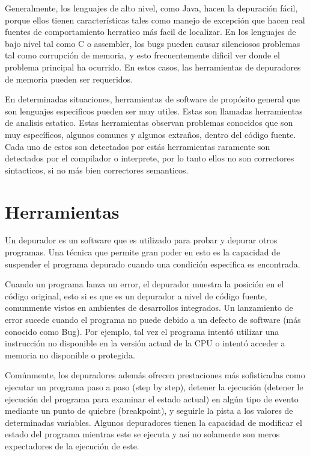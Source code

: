 \documentclass[12pt,a4paper]{report}
\begin{document}
Generalmente, los lenguajes de alto nivel, como Java, hacen la depuración fácil, porque ellos tienen características tales como manejo de excepción que hacen real fuentes de comportamiento herratico más facil de localizar.  En los lenguajes de bajo nivel tal como C o assembler, los bugs pueden causar silenciosos problemas tal como corrupción de memoria, y esto frecuentemente dificil ver donde el problema principal ha ocurrido.  En estos casos, las herramientas de depuradores de memoria pueden ser requeridos.

En determinadas situaciones, herramientas de software de propósito general que son lenguajes especificos pueden ser muy utiles.  Estas son llamadas herramientas de analisis estatico.  Estas herramientas observan problemas conocidos que son muy específicos, algunos comunes y algunos extraños, dentro del código fuente.  Cada uno de estos son detectados por estás herramientas raramente son detectados por el compilador o interprete, por lo tanto ellos no son correctores sintacticos, si no más bien correctores semanticos.


	\section*{Herramientas}

Un depurador es un software que es utilizado para probar y depurar otros programas.  Una técnica que permite gran poder en esto es la capacidad de suspender el programa depurado cuando una condición especifica es encontrada.


Cuando un programa lanza un error, el depurador muestra la posición en el código original, esto si es que es un depurador a nivel de código fuente, comunmente vistos en ambientes de desarrollos integrados.  Un lanzamiento de error sucede cuando el programa no puede debido a un defecto de software (más conocido como Bug).  Por ejemplo, tal vez el programa intentó utilizar una instrucción no disponible en la versión actual de la CPU o intentó acceder a memoria no disponible o protegida.


Comúnmente, los depuradores además ofrecen prestaciones más sofisticadas como ejecutar un programa paso a paso (step by step), detener la ejecución (detener le ejecución del programa para examinar el estado actual) en algún tipo de evento mediante un punto de quiebre (breakpoint), y seguirle la pista a los valores de determinadas variables.  Algunos depuradores tienen la capacidad de modificar el estado del programa mientras este se ejecuta y así no solamente son meros expectadores de la ejecución de este.
\end{document}
